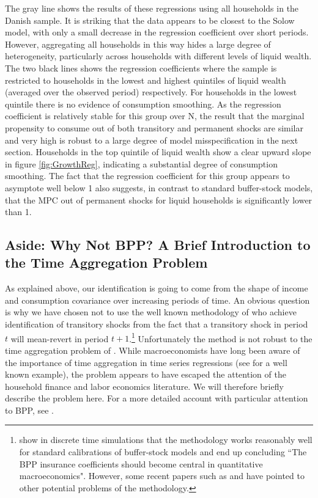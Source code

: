 \documentclass[titlepage]{\econtex}\newcommand{\texname}{ConsumptionHeterogeneity}
\begin{document}
The gray line shows the results of these regressions using all households in the Danish sample. It is striking that the data appears to be closest to the Solow model, with only a small decrease in the regression coefficient over short periods. However, aggregating all households in this way hides a large degree of heterogeneity, particularly across households with different levels of liquid wealth. The two black lines shows the regression coefficients where the sample is restricted to households in the lowest and highest quintiles of liquid wealth (averaged over the observed period) respectively. For households in the lowest quintile there is no evidence of consumption smoothing. As the regression coefficient is relatively stable for this group over N, the result that the marginal propensity to consume out of both transitory and permanent shocks are similar and very high is robust to a large degree of model misspecification in the next section. Households in the top quintile of liquid wealth show a clear upward slope in figure \ref{fig:GrowthReg}, indicating a substantial degree of consumption smoothing. The fact that the regression coefficient for this group appears to asymptote well below 1 also suggests, in contrast to standard buffer-stock models, that the MPC out of permanent shocks for liquid households is significantly lower than 1.

\subsection{Aside: Why Not BPP? A Brief Introduction to the Time Aggregation Problem} \label{TimeAgg}
As explained above, our identification is going to come from the shape of income and consumption covariance over increasing periods of time. An obvious question is why we have chosen not to use the well known methodology of \cite{blundell_consumption_2008} who achieve identification of transitory shocks from the fact that a transitory shock in period $t$ will mean-revert in period $t+1$.\footnote{\cite{kaplan_how_2010} show in discrete time simulations that the methodology works reasonably well for standard calibrations of buffer-stock models and end up concluding ``The BPP insurance coefficients should become central in quantitative macroeconomics". However, some recent papers such as \cite{commault_how_2017} and \cite{hryshko_income_2018} have pointed to other potential problems of the methodology.} Unfortunately the method is not robust to the time aggregation problem of \cite{working_note_1960}. While macroeconomists have long been aware of the importance of time aggregation in time series regressions (see \cite{campbell_consumption_1989} for a well known example), the problem appears to have escaped the attention of the household finance and labor economics literature. We will therefore briefly describe the problem here. For a more detailed account with particular attention to BPP, see \cite{crawley_time_2018}.
\end{document}
